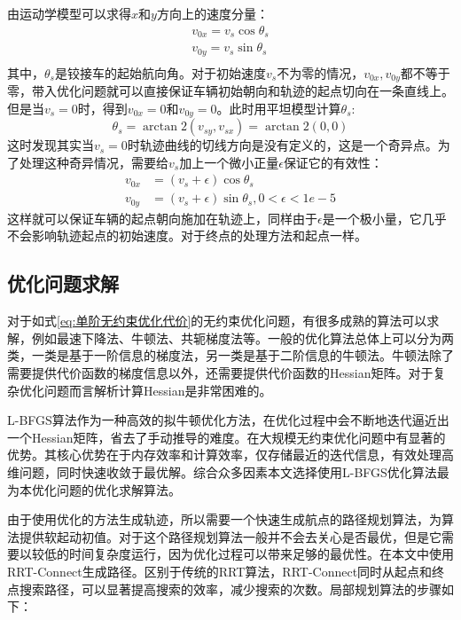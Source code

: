 \documentclass[master,academic]{ysuthesis} %
\begin{document}
		由运动学模型可以求得$x$和$y$方向上的速度分量：
		\begin{equation}
			\begin{aligned}
				v_{0x}=v_s\cos\theta _s\\
				v_{0y}=v_s\sin\theta _s\\
			\end{aligned}
		\end{equation}
		其中，$\theta_s$是铰接车的起始航向角。对于初始速度$v_s$不为零的情况，$v_{0x},v_{0y}$都不等于零，带入优化问题就可以直接保证车辆初始朝向和轨迹的起点切向在一条直线上。但是当$v_{s}=0$时，得到$v_{0x}=0$和$v_{0y}=0$。此时用平坦模型计算$\theta_s$:
		\begin{equation}
			\theta_s=\arctan2 \left( v_{sy},v_{sx} \right) =\arctan2\left( 0,0 \right) 
		\end{equation}
		这时发现其实当$v_{s}=0$时轨迹曲线的切线方向是没有定义的，这是一个奇异点。为了处理这种奇异情况，需要给$v_{s}$加上一个微小正量$\epsilon$保证它的有效性：
		\begin{equation}
			\begin{aligned}
			v_{0x}&=\left( v_s+\epsilon \right) \cos\theta_s\\
			v_{0y}&=\left( v_s+\epsilon \right) \sin\theta_s,0<\epsilon <1e-5
			\end{aligned}
		\end{equation}
		这样就可以保证车辆的起点朝向施加在轨迹上，同样由于$\epsilon$是一个极小量，它几乎不会影响轨迹起点的初始速度。对于终点的处理方法和起点一样。

		\subsection{优化问题求解}
		对于如式\ref{eq:单阶无约束优化代价}的无约束优化问题，有很多成熟的算法可以求解，例如最速下降法、牛顿法、共轭梯度法等。一般的优化算法总体上可以分为两类，一类是基于一阶信息的梯度法，另一类是基于二阶信息的牛顿法。牛顿法除了需要提供代价函数的梯度信息以外，还需要提供代价函数的Hessian矩阵。对于复杂优化问题而言解析计算Hessian是非常困难的。
		
		L-BFGS算法作为一种高效的拟牛顿优化方法，在优化过程中会不断地迭代逼近出一个Hessian矩阵，省去了手动推导的难度。在大规模无约束优化问题中有显著的优势。其核心优势在于内存效率和计算效率，仅存储最近的迭代信息，有效处理高维问题，同时快速收敛于最优解。综合众多因素本文选择使用L-BFGS优化算法最为本优化问题的优化求解算法。

		由于使用优化的方法生成轨迹，所以需要一个快速生成航点的路径规划算法，为算法提供软起动初值。对于这个路径规划算法一般并不会去关心是否最优，但是它需要以较低的时间复杂度运行，因为优化过程可以带来足够的最优性。在本文中使用RRT-Connect生成路径。区别于传统的RRT算法，RRT-Connect同时从起点和终点搜索路径，可以显著提高搜索的效率，减少搜索的次数。局部规划算法的步骤如下：
\end{document}
